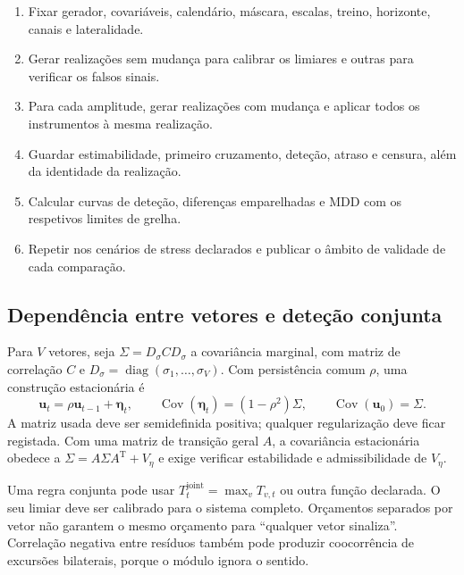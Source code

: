 \begin{tcolorbox}[colback=black!2,colframe=black!45,fontupper=\small,title={Algoritmo G.3 --- Avaliação com verdade conhecida}]
\begin{enumerate}[leftmargin=*,nosep]
\item Fixar gerador, covariáveis, calendário, máscara, escalas, treino, horizonte, canais e lateralidade.
\item Gerar realizações sem mudança para calibrar os limiares e outras para verificar os falsos sinais.
\item Para cada amplitude, gerar realizações com mudança e aplicar todos os instrumentos à mesma realização.
\item Guardar estimabilidade, primeiro cruzamento, deteção, atraso e censura, além da identidade da realização.
\item Calcular curvas de deteção, diferenças emparelhadas e MDD com os respetivos limites de grelha.
\item Repetir nos cenários de stress declarados e publicar o âmbito de validade de cada comparação.
\end{enumerate}
\end{tcolorbox}

\subsection{Dependência entre vetores e deteção conjunta}
\label{sec:mat-simulacao-conjunta}
 Para $V$ vetores,
seja $\Sigma=D_\sigma C D_\sigma$ a covariância marginal, com matriz de correlação $C$ e $D_\sigma=\operatorname{diag}(\sigma_1,\ldots,\sigma_V)$. Com persistência comum $\rho$, uma construção estacionária é
\begin{equation}
\boldsymbol u_t=\rho\boldsymbol u_{t-1}+\boldsymbol\eta_t,
\qquad \operatorname{Cov}(\boldsymbol\eta_t)=(1-\rho^2)\Sigma,
\qquad \operatorname{Cov}(\boldsymbol u_0)=\Sigma.
\label{eq:mat-ar-multivariado}
\end{equation}
A matriz usada deve ser semidefinida positiva; qualquer regularização deve ficar registada. Com uma matriz de transição geral $A$, a covariância estacionária obedece a $\Sigma=A\Sigma A^{\mathrm T}+V_\eta$ e exige verificar estabilidade e admissibilidade de $V_\eta$.

Uma regra conjunta pode usar $T_t^{\mathrm{joint}}=\max_vT_{v,t}$ ou outra função declarada. O seu limiar deve ser calibrado para o sistema completo. Orçamentos separados por vetor não garantem o mesmo orçamento para ``qualquer vetor sinaliza''. Correlação negativa entre resíduos também pode produzir coocorrência de excursões bilaterais, porque o módulo ignora o sentido.

